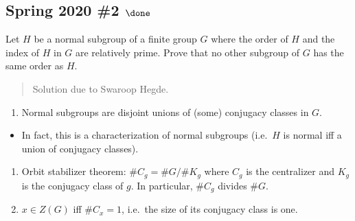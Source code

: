 \hypertarget{spring-2020-2-done}{%
\subsection{\texorpdfstring{Spring 2020 \#2
\(\done\)}{Spring 2020 \#2 \textbackslash done}}\label{spring-2020-2-done}}

Let \(H\) be a normal subgroup of a finite group \(G\) where the order
of \(H\) and the index of \(H\) in \(G\) are relatively prime. Prove
that no other subgroup of \(G\) has the same order as \(H\).

\begin{quote}
Solution due to Swaroop Hegde.
\end{quote}

\begin{concept}

\envlist

\begin{enumerate}
\def\labelenumi{\arabic{enumi}.}
\tightlist
\item
  Normal subgroups are disjoint unions of (some) conjugacy classes in
  \(G\).
\end{enumerate}

\begin{itemize}
\tightlist
\item
  In fact, this is a characterization of normal subgroups (i.e.~\(H\) is
  normal iff a union of conjugacy classes).
\end{itemize}

\begin{enumerate}
\def\labelenumi{\arabic{enumi}.}
\setcounter{enumi}{1}
\tightlist
\item
  Orbit stabilizer theorem: \(\# C_g = \# G/ \# K_g\) where \(C_g\) is
  the centralizer and \(K_g\) is the conjugacy class of \(g\). In
  particular, \(\# C_g\) divides \(\#G\).
\item
  \(x\in Z(G)\) iff \(\# C_x = 1\), i.e.~the size of its conjugacy class
  is one.
\end{enumerate}

\end{concept}

